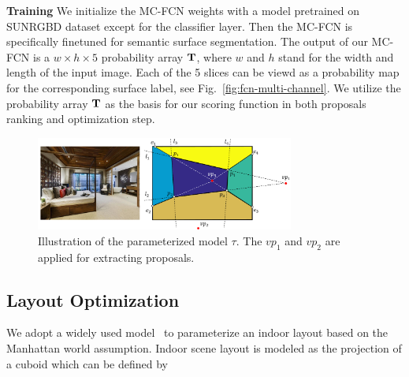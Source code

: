 \noindent\textbf{Training} We initialize the MC-FCN weights with a model pretrained on SUNRGBD dataset except for the classifier layer. Then the MC-FCN is specifically finetuned for semantic surface segmentation. 
%
The output of our MC-FCN is a $w\times h \times 5$ probability array $\mathbf{T}$, where $w$ and $h$ stand for the width and length of the input image. Each of the 5 slices can be viewd as a probability map for the corresponding surface label, see Fig.~\ref{fig:fcn-multi-channel}. We utilize the probability array $\mathbf{T}$ as the basis for our scoring function in both proposals ranking and optimization step. 



\begin{figure}
	\centering
	\includegraphics[width=8.5cm]{figure/parameterization.png}
	\caption{ Illustration of the parameterized model $\tau$. The $vp_1$ and $vp_2$ are applied for extracting proposals. }
	\label{fig:parameterization}
\end{figure}


\subsection{Layout Optimization}
\label{sec:optimization}
We adopt a widely used model~\cite{hedau2009recovering, wang2013discriminative, dasgupta2016delay, ren2016coarse} to parameterize an indoor layout based on the Manhattan world assumption. Indoor scene layout is modeled as the projection of a cuboid which can be defined by 

